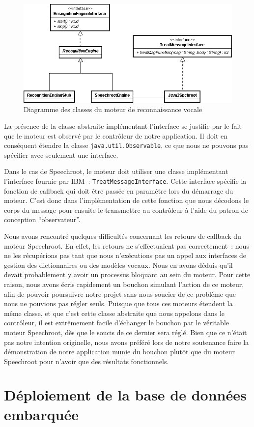 \begin{figure}[ht!]
 \centering
 \includegraphics[scale=.5,keepaspectratio=true]{./images/EngineDiagram.png}
 \caption{Diagramme des classes du moteur de reconnaissance vocale}
 \label{fig:engineDiagram}
\end{figure}

La présence de la classe abstraite implémentant l'interface se justifie par le fait que le moteur est observé par le contrôleur de notre application.
Il doit en conséquent étendre la classe \texttt{java.util.Observable}, ce que nous ne pouvons pas spécifier avec seulement une interface.

Dans le cas de Speechroot, le moteur doit utiliser une classe implémentant l'interface fournie par IBM~: \texttt{TreatMessageInterface}.
Cette interface spécifie la fonction de callback qui doit être passée en paramètre lors du démarrage du moteur.
C'est donc dans l'implémentation de cette fonction que nous décodons le corps du message pour ensuite le transmettre au contrôleur à l'aide du patron de conception ``observateur''.

Nous avons rencontré quelques difficultés concernant les retours de callback du moteur Speechroot.
En effet, les retours ne s'effectuaient pas correctement~: nous ne les récupérions pas tant que nous n'exécutions pas un appel aux interfaces de gestion des dictionnaires ou des modèles vocaux.
Nous en avons déduis qu'il devait probablement y avoir un processus bloquant au sein du moteur.
Pour cette raison, nous avons écris rapidement un bouchon simulant l'action de ce moteur, afin de pouvoir poursuivre notre projet sans nous soucier de ce problème que nous ne pouvions pas régler seuls.
Puisque que tous ces moteurs étendent la même classe, et que c'est cette classe abstraite que nous appelons dans le contrôleur, il est extrêmement facile d'échanger le bouchon par le véritable moteur Speechroot, dès que le soucis de ce dernier sera réglé.
Bien que ce n'était pas notre intention originelle, nous avons préféré lors de notre soutenance faire la démonstration de notre application munie du bouchon plutôt que du moteur Speechroot pour n'avoir que des résultats fonctionnels.



\section{Déploiement de la base de données embarquée}

